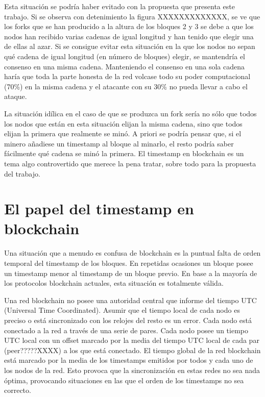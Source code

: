Esta situación se podría haber evitado con la propuesta que presenta este trabajo. Si se observa con detenimiento la figura XXXXXXXXXXXXX, se ve que los forks que se han producido a la altura de los bloques 2 y 3 se debe a que los nodos han recibido varias cadenas de igual longitud y han tenido que elegir una de ellas al azar. Si se consigue evitar esta situación en la que los nodos no sepan qué cadena de igual longitud (en número de bloques) elegir, se mantendría el consenso en una misma cadena. Manteniendo el consenso en una sola cadena haría que toda la parte honesta de la red volcase todo su poder computacional (70\%) en la misma cadena y el atacante con su 30\% no pueda llevar a cabo el ataque. \newline

La situación idílica en el caso de que se produzca un fork sería no sólo que todos los nodos que están en esta situación elijan la misma cadena, sino que todos elijan la primera que realmente se minó. A priori se podría pensar que, si el minero añadiese un timestamp al bloque al minarlo, el resto podría saber fácilmente qué cadena se minó la primera. El timestamp en blockchain es un tema algo controvertido que merece la pena tratar, sobre todo para la propuesta del trabajo.\newline

\section{El papel del timestamp en blockchain}
Una situación que a menudo es confusa de blockchain es la puntual falta de orden temporal del timestamp de los bloques. En repetidas ocasiones un bloque posee un timestamp menor al timestamp de un bloque previo. En base a la mayoría de los protocolos blockchain actuales, esta situación es totalmente válida. \newline

Una red blockchain no posee una autoridad central que informe del tiempo UTC (Universal Time Coordinated). Asumir que el tiempo local de cada nodo es preciso o está sincronizado con los relojes del resto es un error. Cada nodo está conectado a la red a través de una serie de pares. Cada nodo posee un tiempo UTC local con un offset marcado por la media del tiempo UTC local de cada par (peer?????XXXX) a los que está conectado. El tiempo global de la red blockchain está marcado por la media de los timestamps emitidos por todos y cada uno de los nodos de la red. Esto provoca que la sincronización en estas redes no sea nada óptima, provocando situaciones en las que el orden de los timestamps no sea correcto. \newline

